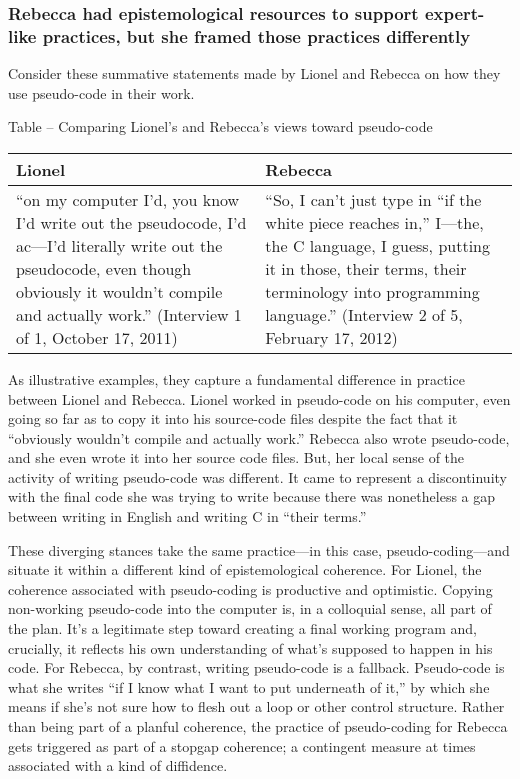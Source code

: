 \subsubsection{Rebecca had epistemological resources to support
expert-like practices, but she framed those practices
differently}\label{rebecca-had-epistemological-resources-to-support-expert-like-practices-but-she-framed-those-practices-differently}

Consider these summative statements made by Lionel and Rebecca on how
they use pseudo-code in their work.

\protect\hypertarget{ux5fToc252445966}{}{}Table -- Comparing Lionel's
and Rebecca's views toward pseudo-code

\begin{longtable}[]{@{}ll@{}}
\toprule
Lionel & Rebecca\tabularnewline
\midrule
\endhead
``on my computer I'd, you know I'd write out the pseudocode, I'd
ac---I'd literally write out the pseudocode, even though obviously it
wouldn't compile and actually work.'' (Interview 1 of 1, October 17,
2011) & ``So, I can't just type in ``if the white piece reaches in,''
I---the, the C language, I guess, putting it in those, their terms,
their terminology into programming language.'' (Interview 2 of 5,
February 17, 2012)\tabularnewline
\bottomrule
\end{longtable}

As illustrative examples, they capture a fundamental difference in
practice between Lionel and Rebecca. Lionel worked in pseudo-code on his
computer, even going so far as to copy it into his source-code files
despite the fact that it ``obviously wouldn't compile and actually
work.'' Rebecca also wrote pseudo-code, and she even wrote it into her
source code files. But, her local sense of the activity of writing
pseudo-code was different. It came to represent a discontinuity with the
final code she was trying to write because there was nonetheless a gap
between writing in English and writing C in ``their terms.''

These diverging stances take the same practice---in this case,
pseudo-coding---and situate it within a different kind of
epistemological coherence. For Lionel, the coherence associated with
pseudo-coding is productive and optimistic. Copying non-working
pseudo-code into the computer is, in a colloquial sense, all part of the
plan. It's a legitimate step toward creating a final working program
and, crucially, it reflects his own understanding of what's supposed to
happen in his code. For Rebecca, by contrast, writing pseudo-code is a
fallback. Pseudo-code is what she writes ``if I know what I want to put
underneath of it,'' by which she means if she's not sure how to flesh
out a loop or other control structure. Rather than being part of a
planful coherence, the practice of pseudo-coding for Rebecca gets
triggered as part of a stopgap coherence; a contingent measure at times
associated with a kind of diffidence.

